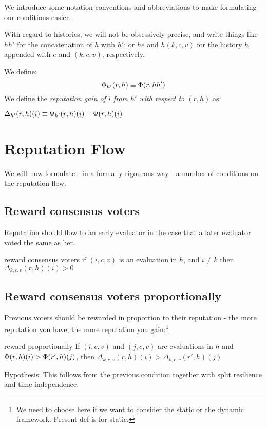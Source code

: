 \documentclass{article}
\begin{document}
We introduce some notation conventions and abbreviations to make formulating our conditions easier.

With regard to histories, we will not be obsessively precise, and write things like $hh'$ for the concatenation of $h$ with $h'$; or $he$ and $h(k,c,v)$ for the history $h$ appended with $e$ and $(k,c,v)$, respectively. 

We define:
\begin{equation}
\Phi_{h'}(r, h) \equiv \Phi(r, hh')
\end{equation}
We define the {\em reputation gain of $i$ from $h'$ with respect to $(r, h)$} as:
\begin{center}
 $ \Delta_{h'}(r, h)(i) \equiv \Phi_{h'}(r, h)(i) - \Phi(r, h)(i)$
\end{center}

\section{Reputation Flow}

We will now formulate - in a formally rigourous way - a number of conditions on the reputation flow.

\subsection{Reward consensus voters}
Reputation should flow to an early evaluator in the case that a later evaluator voted the same as her.
\begin{condition}{reward consensus voters}
if $(i, c, v)$ is an evaluation in $h$, and $i \neq k$ then $\Delta_{k, c, v}(r, h)(i) > 0$
\end{condition}

\subsection{Reward consensus voters proportionally}
Previous voters should be rewarded in proportion to their reputation - the more reputation you have, the more reputation you gain:\footnote{We need to choose here if we want to consider the static or the dynamic framework. Present def is for static.}
\begin{condition}{reward proportionally}
If $(i, c, v)$  and $(j, c, v)$ are evaluations in $h$ and $\Phi(r, h)(i) >\Phi(r', h)(j)$, then
$\Delta_{k, c, v}(r, h)(i) > \Delta_{k,c,v}(r', h)(j)$
\end{condition}
Hypothesis: This follows from the previous condition together with split resilience and time independence.
\end{document}
